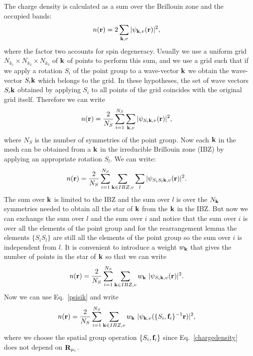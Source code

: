\documentclass[12pt,a4paper,twoside]{report}
\begin{document}
The charge density is calculated as a sum over the
Brillouin zone and the occupied bands:
\begin{equation}
n({\bf r}) = 2 \sum_{{\bf k}, v} |\psi_{{\bf k}, v} ({\bf r}) |^2,
\end{equation}
where the factor two accounts for spin degeneracy.
Usually we use a uniform grid $N_{k_1}\times N_{k_2} \times N_{k_3}$ of ${\bf k}$ of points to perform this sum, and we use a grid such that if we apply a rotation $S_i$ of the point group to a wave-vector ${\bf k}$ we obtain the wave-vector $S_i {\bf k}$ which belongs to the grid. 
In these hypotheses, the set of wave vectors $S_i {\bf k}$ obtained by applying $S_i$ to all points of the grid
coincides with the original grid itself. Therefore we 
can write 
\begin{equation}
n({\bf r}) = {2 \over N_S} \sum_{i=1}^{N_S} \sum_{{\bf k}, v} |\psi_{S_i{\bf k}, v} ({\bf r}) |^2,
\end{equation}
where $N_S$ is the number of symmetries of the point group. Now each ${\bf k}$ in the mesh can be obtained from a ${\bf k}$ in the irreducible Brillouin zone (IBZ) by applying an appropriate rotation $S_l$.
We can write:
\begin{equation}
n({\bf r}) = {2 \over N_S} \sum_{i=1}^{N_S} \sum_{{\bf k} \in IBZ, v} \sum_l |\psi_{S_iS_l{\bf k}, v} ({\bf r}) |^2.
\end{equation}
The sum over ${\bf k}$ is limited to the IBZ and the sum over $l$ is over the $N_{\bf k}$ symmetries needed to obtain all the star of ${\bf k}$ from the 
${\bf k}$ in the IBZ. But now we can exchange the sum over $l$ and the sum over $i$ and notice that the sum over $i$ is over all the elements of the point group and for the rearrangement lemma the elements $\{ S_i S_l\}$ are still all the elements of the point group so the sum over $i$ is independent from $l$. It is convenient to introduce
a weight $w_{\bf k}$ that gives the number of points in the star of ${\bf k}$ so that we can write
\begin{equation}
n({\bf r}) = {2 \over N_S} \sum_{i=1}^{N_S}  \sum_{{\bf k} \in IBZ, v} w_{\bf k}\ |\psi_{S_i{\bf k}, v} ({\bf r}) |^2.
\end{equation}
Now we can use Eq.~\ref{psisik} and write
\begin{equation}
n({\bf r}) = {2 \over N_S} \sum_{i=1}^{N_S} \sum_{{\bf k}\in IBZ , v} w_{\bf k}\ |\psi_{{\bf k}, v} ( \{S_i,{\bf f}_i\}^{-1} {\bf r}) |^2,
\label{chargedensity}
\end{equation}
where we choose the spatial group operation $\{S_i,{\bf f}_i\}$ since Eq.~\ref{chargedensity} does not depend on
${\bf R}_{\mu_i}$.
\end{document}
